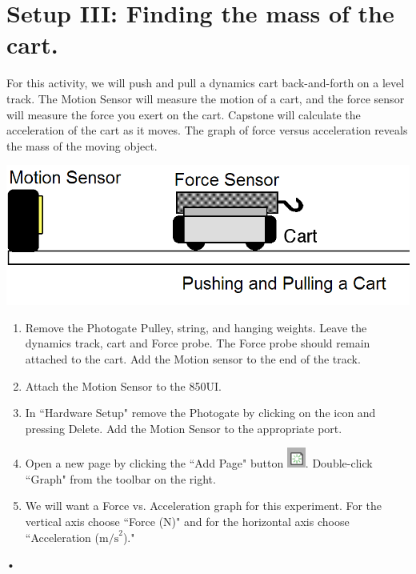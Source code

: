 \documentclass[main.tex]{subfiles}
\begin{document}
\section{Setup III: Finding the mass of the cart.}
For this activity, we will push and pull a dynamics cart back-and-forth on a level track. The Motion Sensor will measure the motion of a cart, and the force sensor will measure the force you exert on the cart. Capstone will calculate the acceleration of the cart as it moves. The graph of force versus acceleration reveals the mass of the moving object.

\includegraphics[width=\textwidth]{Force_3_Setup}

\begin{enumerate}
\item
Remove the Photogate Pulley, string, and hanging weights. Leave the dynamics track, cart and Force probe. The Force probe should remain attached to the cart. Add the Motion sensor to the end of the track.
\item
Attach the Motion Sensor to the 850UI.
\item
In ``Hardware Setup" remove the Photogate by clicking on the icon and pressing Delete. Add the Motion Sensor to the appropriate port.
\item
Open a new page by clicking the ``Add Page" button \includegraphics{Add_Page}. Double-click ``Graph" from the toolbar on the right.
\item
We will want a Force vs. Acceleration graph for this experiment. For the vertical axis choose ``Force (N)" and for the horizontal axis choose ``Acceleration ($\text{m/s}^2$)."
\end{enumerate}•
\end{document}
